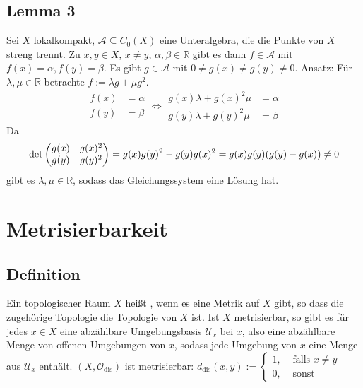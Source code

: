 \subsection[Lemma 3: Existenz von $f \in \mathcal{A}$ mit $f(x)=\alpha$, $f(y)=\beta$, wenn $\mathcal{A}$ streng trennt]{Lemma 3} %
\label{sub:69}
Sei $X$ lokalkompakt, $\mathcal{A} \subseteq C_0(X)$ eine Unteralgebra, die die Punkte von $X$ streng trennt. Zu $x,y \in X$, $x \not= y$, $\alpha, \beta \in \mathds{R}$
gibt es dann $f \in \mathcal{A}$ mit $f(x) = \alpha, f(y) = \beta$.
Es gibt $g \in \mathcal{A}$ mit $0 \not= g(x) \not= g(y) \not= 0$. Ansatz: Für $\lambda , \mu \in \mathds{R}$ betrachte $f := \lambda g + \mu g^2$.
\[
	\begin{aligned}
		f(x) &{}= \alpha \\
		f(y) &{}= \beta
	\end{aligned} 
	\iff
	\begin{aligned}
		g(x) \lambda + g(x)^2 \mu &= \alpha \\
		g(y) \lambda + g(y)^2 \mu &= \beta
	\end{aligned} 
\]
Da 
\[
	\det \begin{pmatrix}
		g(x)& g(x)^2 \\
		g(y) & g(y)^2
	\end{pmatrix} = g(x) g(y)^2 - g(y) g(x)^2 = g(x)g(y) \enbrace*{g(y) - g(x)} \not= 0 
\]
gibt es $\lambda , \mu \in \mathds{R}$, sodass das Gleichungssystem eine Lösung hat. \bewende
\newpage

\section{Metrisierbarkeit} %
\label{sec:7}

\subsection[Definition: Metrisierbar]{Definition} %
\label{sub:71}
Ein topologischer Raum $X$ heißt , wenn es eine Metrik auf $X$ gibt, so dass die zugehörige Topologie die Topologie von $X$ ist. 
Ist $X$ metrisierbar, so gibt es für jedes $x \in X$ eine abzählbare Umgebungsbasis $\mathcal{U}_x$ bei $x$, also eine abzählbare Menge von offenen Umgebungen von $x$,
sodass jede Umgebung von $x$ eine Menge aus $\mathcal{U}_x$ enthält. 
$(X, \mathcal{O}_{\text{dis}})$ ist metrisierbar: $d_{\text{dis}}(x,y) := \begin{cases}
	1, &\text{ falls }x \not= y\\
	0 , &\text{ sonst}
\end{cases}$


